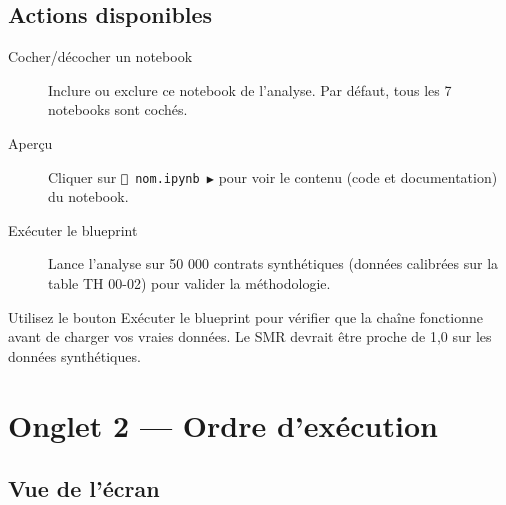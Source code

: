 \documentclass[11pt,a4paper]{article}
\begin{document}
\subsection{Actions disponibles}

\begin{description}
  \item[Cocher/décocher un notebook] Inclure ou exclure ce notebook de l'analyse.
        Par défaut, tous les 7 notebooks sont cochés.
  \item[Aperçu] Cliquer sur \og \texttt{📓 nom.ipynb ▶} \fg{} pour voir le contenu
        (code et documentation) du notebook.
  \item[Exécuter le blueprint] Lance l'analyse sur 50 000 contrats synthétiques
        (données calibrées sur la table TH 00-02) pour valider la méthodologie.
\end{description}

\begin{tipbox}[Conseil]
Utilisez le bouton \og Exécuter le blueprint \fg{} pour vérifier que la chaîne fonctionne
avant de charger vos vraies données. Le SMR devrait être proche de 1,0 sur les données synthétiques.
\end{tipbox}

\section{Onglet 2 — Ordre d'exécution}

\subsection{Vue de l'écran}
\end{document}
